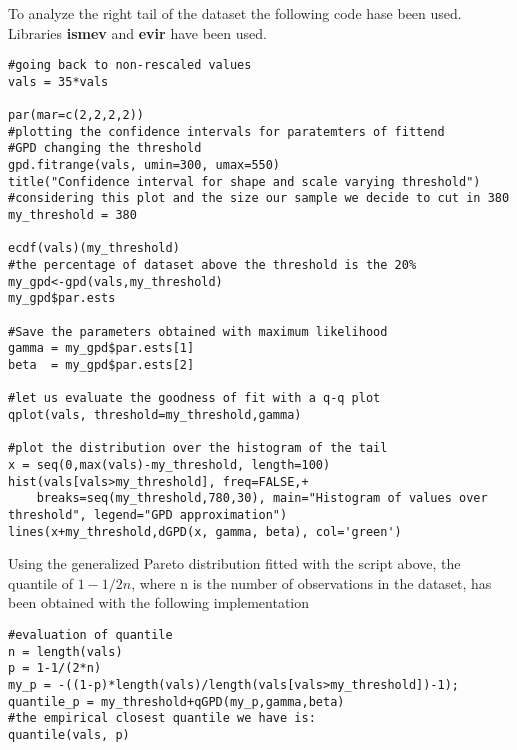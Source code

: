 To analyze the right tail of the dataset the following code hase been used. Libraries \textbf{ismev} and \textbf{evir} have been used.
\begin{lstlisting}
#going back to non-rescaled values
vals = 35*vals

par(mar=c(2,2,2,2))
#plotting the confidence intervals for paratemters of fittend 
#GPD changing the threshold
gpd.fitrange(vals, umin=300, umax=550)
title("Confidence interval for shape and scale varying threshold")
#considering this plot and the size our sample we decide to cut in 380
my_threshold = 380

ecdf(vals)(my_threshold)
#the percentage of dataset above the threshold is the 20%
my_gpd<-gpd(vals,my_threshold)
my_gpd$par.ests

#Save the parameters obtained with maximum likelihood
gamma = my_gpd$par.ests[1]
beta  = my_gpd$par.ests[2]

#let us evaluate the goodness of fit with a q-q plot
qplot(vals, threshold=my_threshold,gamma)

#plot the distribution over the histogram of the tail
x = seq(0,max(vals)-my_threshold, length=100)
hist(vals[vals>my_threshold], freq=FALSE,+
    breaks=seq(my_threshold,780,30), main="Histogram of values over threshold", legend="GPD approximation")
lines(x+my_threshold,dGPD(x, gamma, beta), col='green')
\end{lstlisting}

Using the generalized Pareto distribution fitted with the script above, the quantile of $1-1/2n$, where n is the number of observations in the dataset, has been obtained with the following implementation
\begin{lstlisting}
#evaluation of quantile
n = length(vals)
p = 1-1/(2*n)
my_p = -((1-p)*length(vals)/length(vals[vals>my_threshold])-1);
quantile_p = my_threshold+qGPD(my_p,gamma,beta)
#the empirical closest quantile we have is:
quantile(vals, p)
\end{lstlisting}

